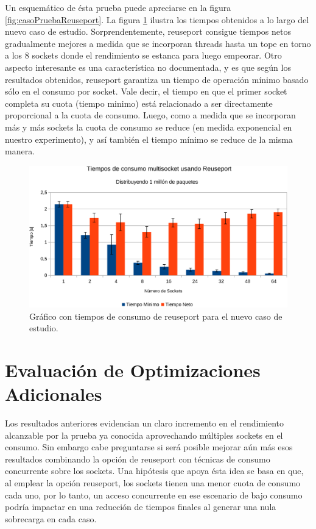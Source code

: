 Un esquemático de ésta prueba puede apreciarse en la figura \ref{fig:casoPruebaReuseport}. La figura \ref{fig:resultadosReuseport} ilustra los tiempos obtenidos a lo largo del nuevo caso de estudio. Sorprendentemente, reuseport consigue tiempos netos gradualmente mejores a medida que se incorporan threads hasta un tope en torno a los 8 sockets donde el rendimiento se estanca para luego empeorar. Otro aspecto interesante es una característica no documentada, y es que según los resultados obtenidos, reuseport garantiza un tiempo de operación mínimo basado sólo en el consumo por socket. Vale decir, el tiempo en que el primer socket completa su cuota (tiempo minimo) está relacionado a ser directamente proporcional a la cuota de consumo. Luego, como a medida que se incorporan más y más sockets la cuota de consumo se reduce (en medida exponencial en nuestro experimento), y así también el tiempo mínimo se reduce de la misma manera.

\begin{figure}[!h]
	\centering
	\includegraphics[scale=.6]{resultados/reuseport1-crop.pdf}
	\caption{Gráfico con tiempos de consumo de reuseport para el nuevo caso de estudio.}
	\label{fig:resultadosReuseport}
\end{figure}

\section{Evaluación de Optimizaciones Adicionales}
Los resultados anteriores evidencian un claro incremento en el rendimiento alcanzable por la prueba ya conocida aprovechando múltiples sockets en el consumo. Sin embargo cabe preguntarse si será posible mejorar aún más esos resultados combinando la opción de reuseport con técnicas de consumo concurrente sobre los sockets. Una hipótesis que apoya ésta idea se basa en que, al emplear la opción reuseport, los sockets tienen una menor cuota de consumo cada uno, por lo tanto, un acceso concurrente en ese escenario de bajo consumo podría impactar en una reducción de tiempos finales al generar una nula sobrecarga en cada caso.

